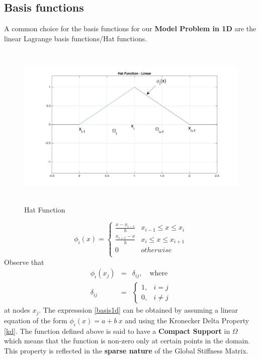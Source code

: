 \subsection{Basis functions}
A common choice for the basis functions for our \textbf{Model Problem in 1D} are the linear Lagrange basis functions/Hat functions.
\begin{figure}[h]
	\centering
	\includegraphics[width=12cm,height=8cm]{images/hat.jpg}
	\caption{Hat Function}
\end{figure}
\begin{equation}
\phi_i(x) = \left\{
\begin{array}{ll}
\frac{x-x_{i-1}}{h} & x_{i-1}\leq x\leq x_i \\
\frac{x_{i+1}-x}{h} & x_i\leq x\leq x_{i+1} \\
0 & otherwise\\
\end{array} 
\right. \label{basis1d}
\end{equation}
Observe that  
\begin{eqnarray}
\phi_i(x_j) &=& \delta_{ij}, \quad \text{where} \label{kd}\\
\delta_{ij} &=& \left\{ 
\begin{array}{ll}
1, & i=j\\
0, & i\ne j	
\end{array}
\right.
\end{eqnarray}
at nodes $x_j$. The expresssion \ref{basis1d} can be obtained by assuming a linear equation of the form $\phi_i(x) = a+b\ x$ and using the Kronecker Delta Property \ref{kd}. The function defined above is said to have a \textbf{Compact Support} in $\Omega$ which means that the function is non-zero only at certain points in the domain. This property is reflected in the \textbf{sparse nature} of the Global Stiffness Matrix.\\


